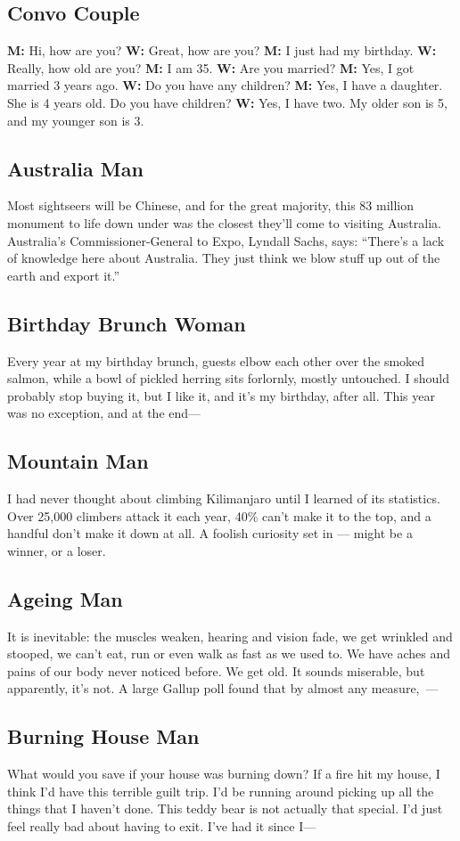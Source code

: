 \subsection*{Convo Couple}
\textbf{M:} Hi, how are you? \textbf{W:} Great, how are you? \textbf{M:} I just had my birthday. \textbf{W:} Really, how old are you? \textbf{M:} I am 35. \textbf{W:} Are you married? \textbf{M:} Yes, I got married 3 years ago. \textbf{W:} Do you have any children? \textbf{M:} Yes, I have a daughter. She is 4 years old. Do you have children? \textbf{W:} Yes, I have two. My older son is 5, and my younger son is 3.

\subsection*{Australia Man}
Most sightseers will be Chinese, and for the great majority, this 83 million monument to life down under was the closest they'll come to visiting Australia. Australia's Commissioner-General to Expo, Lyndall Sachs, says: ``There's a lack of knowledge here about Australia. They just think we blow stuff up out of the earth and export it.''

\subsection*{Birthday Brunch Woman}
Every year at my birthday brunch, guests elbow each other over the smoked salmon, while a bowl of pickled herring sits forlornly, mostly untouched. I should probably stop buying it, but I like it, and it's my birthday, after all. This year was no exception, and at the end---

\subsection*{Mountain Man}
I had never thought about climbing Kilimanjaro until I learned of its statistics. Over 25,000 climbers attack it each year, 40\% can't make it to the top, and a handful don't make it down at all. A foolish curiosity set in --- might be a winner, or a loser.

\subsection*{Ageing Man}
It is inevitable: the muscles weaken, hearing and vision fade, we get wrinkled and stooped, we can't eat, run or even walk as fast as we used to. We have aches and pains of our body never noticed before. We get old. It sounds miserable, but apparently, it's not. A large Gallup poll found that by almost any measure,~---

\subsection*{Burning House Man}
What would you save if your house was burning down? If a fire hit my house, I think I'd have this terrible guilt trip. I'd be running around picking up all the things that I haven't done. This teddy bear is not actually that special. I'd just feel really bad about having to exit. I've had it since I---
